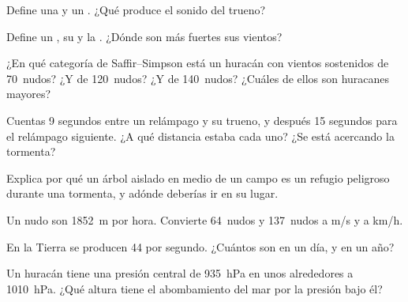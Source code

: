 \begin{exercise}[$\star$]\label{exo:g10:storms-and-cyclones:1}
Define una  y un . ¿Qué produce el sonido del trueno?
\end{exercise}

\begin{exercise}[$\star$]\label{exo:g10:storms-and-cyclones:2}
Define un , su  y la . ¿Dónde son más fuertes
sus vientos?
\end{exercise}

\begin{exercise}[$\star$]\label{exo:g10:storms-and-cyclones:3}
¿En qué categoría de Saffir--Simpson está un huracán con vientos sostenidos
de \num{70}~nudos? ¿Y de \num{120}~nudos? ¿Y de \num{140}~nudos? ¿Cuáles de
ellos son huracanes mayores?
\end{exercise}

\begin{exercise}[$\star$]\label{exo:g10:storms-and-cyclones:4}
Cuentas \num{9} segundos entre un relámpago y su trueno, y después \num{15}
segundos para el relámpago siguiente. ¿A qué distancia estaba cada uno? ¿Se
está acercando la tormenta?
\end{exercise}

\begin{exercise}[$\star$]\label{exo:g10:storms-and-cyclones:5}
Explica por qué un árbol aislado en medio de un campo es un refugio peligroso
durante una tormenta, y adónde deberías ir en su lugar.
\end{exercise}

\begin{exercise}[$\star\star$]\label{exo:g10:storms-and-cyclones:6}
Un nudo son \qty{1852}{m} por hora. Convierte \num{64}~nudos y
\num{137}~nudos a \unit{m/s} y a \unit{km/h}.
\end{exercise}

\begin{exercise}[$\star\star$]\label{exo:g10:storms-and-cyclones:7}
En la Tierra se producen 44  por segundo. ¿Cuántos son en un día, y en
un año?
\end{exercise}

\begin{exercise}[$\star\star$]\label{exo:g10:storms-and-cyclones:8}
Un huracán tiene una presión central de \qty{935}{hPa} en unos alrededores a
\qty{1010}{hPa}. ¿Qué altura tiene el abombamiento del mar por la presión
bajo él?
\end{exercise}

